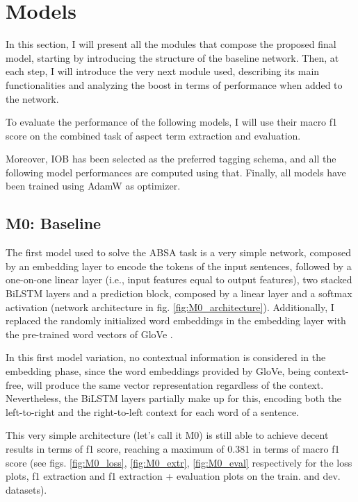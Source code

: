 \documentclass[11pt,a4paper]{article}
\begin{document}
	\section{Models}
	In this section, I will present all the modules that compose the proposed final
	model, starting by introducing the structure of the baseline network. Then, at
	each step, I will introduce the very next module used, describing its main
	functionalities and analyzing the boost in terms of performance when added to
	the network.
	
	To evaluate the performance of the following models, I will use their macro f1
	score on the combined task of aspect term extraction and evaluation.
	
	Moreover, IOB has been selected as the preferred tagging schema, and all the
	following model performances are computed using that. Finally, all models have
	been trained using AdamW as optimizer.
	
	\subsection{M0: Baseline}
	The first model used to solve the ABSA task is a very simple network, composed
	by an embedding layer to encode the tokens of the input sentences, followed by a
	one-on-one linear layer (i.e., input features equal to output features), two
	stacked BiLSTM layers and a prediction block, composed by a linear layer and a
	softmax activation (network architecture in fig. \ref{fig:M0_architecture}).
	Additionally, I replaced the randomly initialized word embeddings in the
	embedding layer with the pre-trained word vectors of GloVe
	\citep{pennington2014glove}.
	
	In this first model variation, no contextual information is considered in the
	embedding phase, since the word embeddings provided by GloVe, being
	context-free, will produce the same vector representation regardless of the
	context. Nevertheless, the BiLSTM layers partially make up for this, encoding
	both the left-to-right and the right-to-left context for each word of a
	sentence.
	
	This very simple architecture (let's call it M0) is still able to achieve
	decent results in terms of f1 score, reaching a maximum of 0.381 in terms of
	macro f1 score (see figs. \ref{fig:M0_loss}, \ref{fig:M0_extr},
	\ref{fig:M0_eval} respectively for the loss plots, f1 extraction and f1
	extraction + evaluation plots on the train. and dev. datasets).
	
\end{document}
